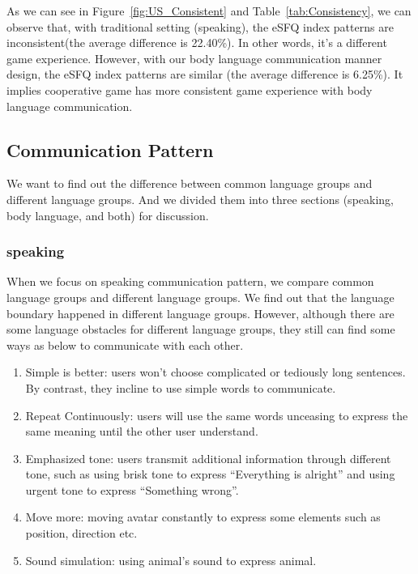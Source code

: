 As we can see in Figure~\ref{fig:US_Consistent} and Table~\ref{tab:Consistency}, we can observe that, with traditional setting (speaking), the eSFQ index patterns are inconsistent(the average difference is 22.40\%). In other words, it's a different game experience. However, with our body language communication manner design, the eSFQ 
index patterns are similar (the average difference is 6.25\%). It implies cooperative game has more consistent game experience with body language communication.




\subsection{Communication Pattern}
We want to find out the difference between common language groups and different language groups. And we divided them into three sections (speaking, body language, and both) for discussion.

\subsubsection{speaking}
When we focus on speaking communication pattern, we compare common language groups and different language groups. We find out that the language boundary happened in different language groups. However, although there are some language obstacles for different language groups, they still can find some ways as below to communicate with each other.

\begin{enumerate}
  \item Simple is better: users won't choose complicated or tediously long sentences. By contrast, they incline to use simple words to communicate. 

  \item Repeat Continuously: users will use the same words unceasing to express the same meaning until the other user understand.
  
  \item Emphasized tone: users transmit additional information through different tone, such as using brisk tone to express ``Everything is alright'' and using urgent tone to express ``Something wrong''.
  
  \item Move more: moving avatar constantly to express some elements such as position, direction etc.
  
  \item Sound simulation: using animal's sound to express animal.
\end{enumerate}

